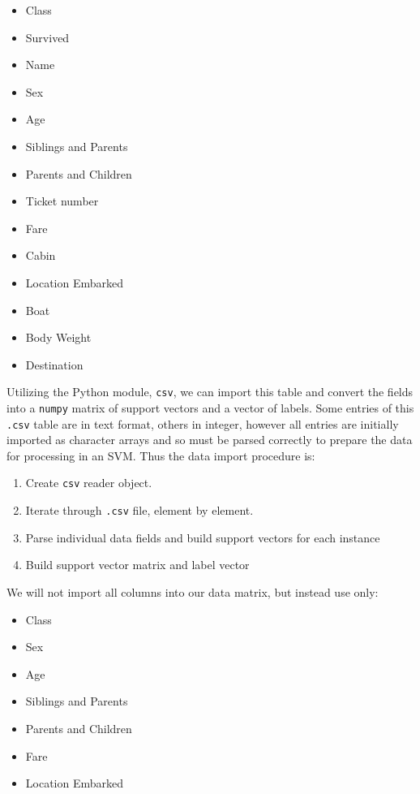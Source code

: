 \documentclass[11pt,a4paper]{article}
\begin{document}
\begin{itemize}
\item Class
\item Survived
\item Name
\item Sex
\item Age
\item Siblings and Parents
\item Parents and Children
\item Ticket number
\item Fare
\item Cabin
\item Location Embarked
\item Boat
\item Body Weight
\item Destination
\end{itemize}

Utilizing the Python module, \verb|csv|, we can import this table and convert the fields into a \verb|numpy| matrix of support vectors and a vector of labels. Some entries of this \verb|.csv| table are in text format, others in integer, however all entries are initially imported as character arrays and so must be parsed correctly to prepare the data for processing in an SVM. Thus the data import procedure is:

\begin{enumerate}
\item Create \verb|csv| reader object.
\item Iterate through \verb|.csv| file, element by element.
\item Parse individual data fields and build support vectors for each instance
\item Build support vector matrix and label vector
\end{enumerate}

We will not import all columns into our data matrix, but instead use only:

\begin{itemize}
\item Class
\item Sex
\item Age
\item Siblings and Parents
\item Parents and Children
\item Fare
\item Location Embarked
\end{itemize}
\end{document}
